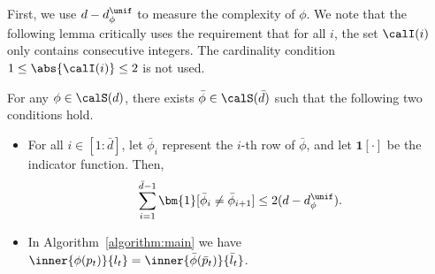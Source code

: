 \documentclass[10pt]{article}
\begin{document}
First, we use $d-d^\unif_\phi$ to measure the complexity of $\phi$. We note that the following lemma critically uses the requirement that for all $i$, the set $\calI(i)$ only contains consecutive integers. The cardinality condition $1\leq\abs{\calI(i)}\leq 2$ is not used. 

\begin{lemma}\label{lemma:relabeling_uniform}
For any $\phi\in\calS(d)$, there exists $\bar\phi\in\calS(\bar d)$ such that the following two conditions hold. 
\begin{itemize}
\item For all $i\in[1:\bar d]$, let $\bar\phi_{i}$ represent the $i$-th row of $\bar \phi$, and let $\bm{1}[\cdot]$ be the indicator function. Then, 
\begin{equation*}
\sum_{i=1}^{\bar d-1}\bm{1}[\bar \phi_{i}\neq \bar \phi_{i+1}]\leq 2 (d-d^\unif_\phi).
\end{equation*}
\item In Algorithm~\ref{algorithm:main} we have $\inner{\phi(p_t)}{l_t}=\inner{\bar \phi(\bar p_t)}{\bar l_t}$.
\end{itemize}
\end{lemma}
\end{document}
